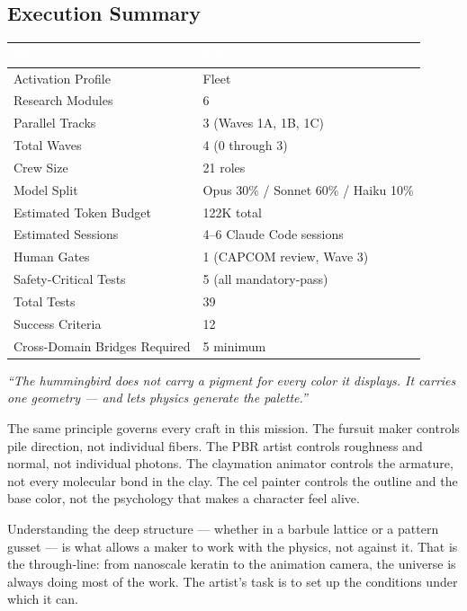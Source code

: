 \documentclass[11pt,letterpaper]{article}
\newcommand{\tableheader}[1]{\textbf{\sffamily\textcolor{white}{#1}}}
\begin{document}
\subsection{Execution Summary}

\begin{center}
\begin{tabularx}{\textwidth}{L{5cm}X}
\toprule
{}
\tableheader{Metric} & \tableheader{Value} \\
\midrule
Activation Profile & Fleet \\
Research Modules & 6 \\
Parallel Tracks & 3 (Waves 1A, 1B, 1C) \\
Total Waves & 4 (0 through 3) \\
Crew Size & 21 roles \\
Model Split & Opus 30\% / Sonnet 60\% / Haiku 10\% \\
Estimated Token Budget & 122K total \\
Estimated Sessions & 4--6 Claude Code sessions \\
Human Gates & 1 (CAPCOM review, Wave 3) \\
Safety-Critical Tests & 5 (all mandatory-pass) \\
Total Tests & 39 \\
Success Criteria & 12 \\
Cross-Domain Bridges Required & 5 minimum \\
\bottomrule
\end{tabularx}
\end{center}

\vspace{2em}

\begin{quotebox}
\textit{``The hummingbird does not carry a pigment for every color it displays. It carries one geometry --- and lets physics generate the palette.''} 

\vspace{0.5em}
The same principle governs every craft in this mission. The fursuit maker controls pile direction, not individual fibers. The PBR artist controls roughness and normal, not individual photons. The claymation animator controls the armature, not every molecular bond in the clay. The cel painter controls the outline and the base color, not the psychology that makes a character feel alive.

Understanding the deep structure --- whether in a barbule lattice or a pattern gusset --- is what allows a maker to work with the physics, not against it. That is the through-line: from nanoscale keratin to the animation camera, the universe is always doing most of the work. The artist's task is to set up the conditions under which it can.
\end{quotebox}
\end{document}
